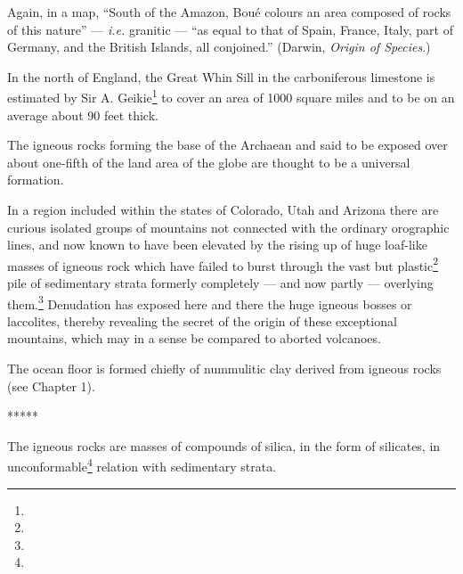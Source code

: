 \documentclass[a4paper, 12pt, oneside]{article}
\begin{document}
Again, in a map, ``South of the Amazon, Boué colours an area composed of rocks of this nature'' --- \emph{i.e.} granitic --- ``as equal to that of Spain, France, Italy, part of Germany, and the British Islands, all conjoined.'' (Darwin, \emph{Origin of Species}.)

In the north of England, the Great Whin Sill in the carboniferous limestone is estimated by Sir A. Geikie\footnote{} to cover an area of 1000 square miles and to be on an average about 90 feet thick.

The igneous rocks forming the base of the Archaean and said to be exposed over about one-fifth of the land area of the globe are thought to be a universal formation.

In a region included within the states of Colorado, Utah and Arizona there are curious isolated groups of mountains not connected with the ordinary orographic lines, and now known to have been elevated by the rising up of huge loaf-like masses of igneous rock which have failed to burst through the vast but plastic\footnote{} pile of sedimentary strata formerly completely --- and now partly --- overlying them.\footnote{} Denudation has exposed here and there the huge igneous bosses or laccolites, thereby revealing the secret of the origin of these exceptional mountains, which may in a sense be compared to aborted volcanoes.

The ocean floor is formed chiefly of nummulitic clay derived from igneous rocks (see Chapter 1).

\centerline{*\hspace{15mm}*\hspace{15mm}*\hspace{15mm}*\hspace{15mm}*}
\bigskip

The igneous rocks are masses of compounds of silica, in the form of silicates, in unconformable\footnote{} relation with sedimentary strata.
\end{document}
